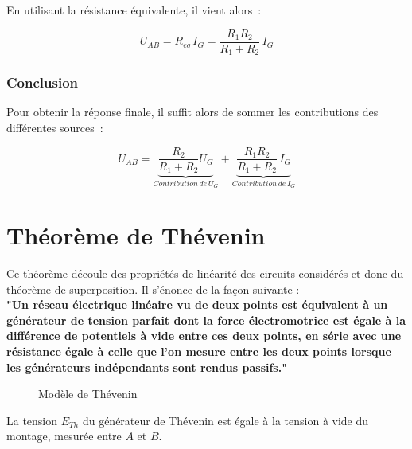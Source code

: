 \begin{center}
	
\end{center}

En utilisant la résistance équivalente, il vient alors~:

$$ U_{AB} = R_{eq}\,I_G = \dfrac{R_1 R_2}{R_1 + R_2}\,I_G $$

\subsubsection*{Conclusion}

\begin{center}
	
\end{center}

Pour obtenir la réponse finale, il suffit alors de sommer les contributions des différentes sources~:

$$ U_{AB} = \underbrace{\dfrac{R_2}{R_1 + R_2} U_G}_{Contribution\,de\,U_G} + \underbrace{\dfrac{R_1 R_2}{R_1 + R_2}\,I_G}_{Contribution\,de\,I_G} $$

\pagebreak

\section{Théorème de Thévenin}

Ce théorème découle des propriétés de linéarité des circuits considérés et donc du théorème de superposition. Il s'énonce de la façon suivante : \\

\textbf{"Un réseau électrique linéaire vu de deux points est équivalent à un générateur de tension parfait dont la force électromotrice est égale à la différence de potentiels à vide entre ces deux points, en série avec une résistance égale à celle que l'on mesure entre les deux points lorsque les générateurs indépendants sont rendus passifs."}

\begin{figure}[!h]
\begin{center}
	
\end{center}
\caption{Modèle de Thévenin}
\end{figure}
La tension $E_{Th}$ du générateur de Thévenin est égale à la tension à vide du montage, mesurée entre $A$ et $B$. \\

